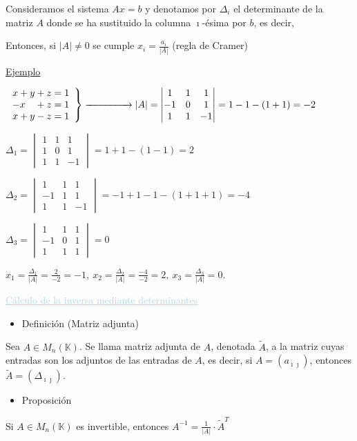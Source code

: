 \documentclass[12pt]{article}
\begin{document}
Consideramos el sistema $Ax=b$ y denotamos por $\Delta_i$ el
determinante de la matriz $A$ donde se ha sustituido la columna
$\imath$-ésima por $b$, es decir,

\begin{center}
\end{center}
Entonces, si $|A|\neq0$ se cumple $x_i=\frac{a_i}{|A|}$ (regla
de Cramer)

\underline{Ejemplo}

$\left.\begin{array}{r}
x+y+z=1\\
-x\quad+z=1\\
x+y-z=1
\end{array}\right\rbrace\xrightarrow{\hspace{1.5cm}}|A|=\begin{vmatrix}
1 & 1 & 1 \\ 
-1 & 0 & 1 \\ 
1 & 1 & -1
\end{vmatrix}=1-1-(1+1)=-2$

$\Delta_1=\begin{vmatrix}
1 & 1 & 1 \\ 
1 & 0 & 1 \\ 
1 & 1 & -1
\end{vmatrix}=1+1-(1-1)=2$

$\Delta_2=\begin{vmatrix}
1 & 1 & 1 \\ 
-1 & 1 & 1 \\ 
1 & 1 & -1
\end{vmatrix}=-1+1-1-(1+1+1)=-4$

$\Delta_3=\begin{vmatrix}
1 & 1 & 1 \\ 
-1 & 0 & 1 \\ 
1 & 1 & 1
\end{vmatrix}=0$

$x_1=\frac{\Delta_1}{|A|}=\frac{2}{-2}=-1,~x_2=\frac{\Delta_2}{|A|}=\frac{-4}{-2}=2,~x_3=\frac{\Delta_3}{|A|}=0$.

\textcolor{lightblue}{\underline{Cálculo de la inversa mediante
determinantes}}
\begin{itemize}[label=\color{red}\textbullet, leftmargin=*]
    \item \color{lightblue} Definición (Matriz adjunta)
\end{itemize}
Sea $A\in M_n(\mathbb{K})$. Se llama matriz adjunta de $A$,
denotada $\tilde{A}$, a la matriz cuyas entradas son los adjuntos
de las entradas de $A$, es decir, si $A=(a_{\imath\jmath  })$, entonces
$\tilde{A}=(\Delta_{\imath\jmath  })$.
\begin{itemize}[label=\color{red}\textbullet, leftmargin=*]
    \item \color{lightblue} Proposición
\end{itemize}
Si $A\in M_n(\mathbb{K})$ es invertible, entonces
$A^{-1}=\frac{1}{|A|}\cdot\tilde{A}^T$
\end{document}
